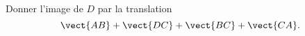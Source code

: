 
\begin{exercice}\label{exosmath-0213}

    \begin{multicols}{2}
    Donner l'image de \( D\) par la translation 
    \begin{equation}
        \vect{ AB }+\vect{ DC }+\vect{ BC }+\vect{ CA }.
    \end{equation}

    \columnbreak
    \begin{center}

    \end{center}
    \end{multicols}



\end{exercice}
